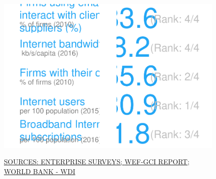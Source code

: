 \documentclass{article}\usepackage[]{graphicx}\usepackage[]{color}
\makeatletter
\def\maxwidth{ %
  \ifdim\Gin@nat@width>\linewidth
    \linewidth
  \else
    \Gin@nat@width
  \fi
}
\makeatother
\begin{document}
\begin{figure}
\begin{minipage}[c]{0.95\textwidth}
\begin{minipage}[b]{0.95\textwidth}
\begin{minipage}[c]{0.50\textwidth}
\begin{minipage}[c]{0.99\textwidth}
{\centering \includegraphics[width=\maxwidth]{figure/number_chart_Markets-1} 

}



      \vspace{-5ex}
      \end{minipage}
      \hspace{4ex}\scriptsize{\href{http://www.enterprisesurveys.org/data/exploretopics/innovation-and-technology}{\textcolor[HTML]{22A6F5}{SOURCES: ENTERPRISE SURVEYS; }}\href{http://www3.weforum.org/docs/gcr/2015-2016/GCI_Dataset_2006-2015.xlsx}{\textcolor[HTML]{22A6F5}{WEF-GCI REPORT; }}\href{http://data.worldbank.org}{\textcolor[HTML]{22A6F5}{WORLD BANK - WDI}}}
    \end{minipage}
  \end{minipage}  
  


\end{minipage}
\end{figure}
\end{document}
